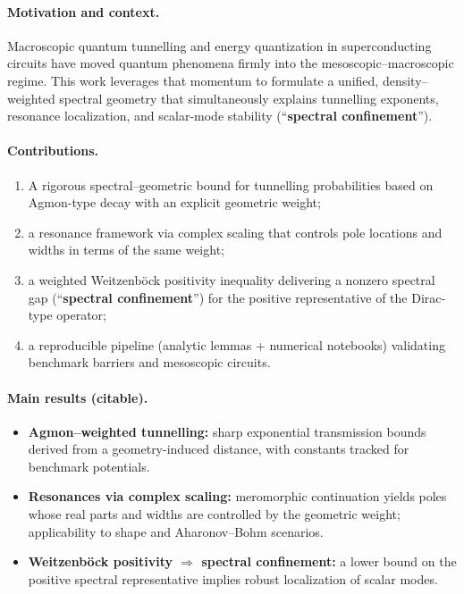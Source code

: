 \documentclass[11pt]{article}
\theoremstyle{definition}
\begin{document}
	\paragraph{Motivation and context.}
	Macroscopic quantum tunnelling and energy quantization in superconducting circuits have moved quantum phenomena firmly into the mesoscopic--macroscopic regime. This work leverages that momentum to formulate a unified, density–weighted spectral geometry that simultaneously explains tunnelling exponents, resonance localization, and scalar-mode stability (``\textbf{spectral confinement}'').
	
	\paragraph{Contributions.}
	\begin{enumerate}[label=(\roman*)]
	\item A rigorous spectral–geometric bound for tunnelling probabilities based on Agmon-type decay with an explicit geometric weight; 
	\item a resonance framework via complex scaling that controls pole locations and widths in terms of the same weight;
	\item a weighted Weitzenböck positivity inequality delivering a nonzero spectral gap (``\textbf{spectral confinement}'') for the positive representative of the Dirac-type operator; 
	\item a reproducible pipeline (analytic lemmas + numerical notebooks) validating benchmark barriers and mesoscopic circuits.
	\end{enumerate}
	\paragraph{Main results (citable).}
	\begin{itemize}
		\item \textbf{Agmon–weighted tunnelling:} sharp exponential transmission bounds derived from a geometry-induced distance, with constants tracked for benchmark potentials.
		\item \textbf{Resonances via complex scaling:} meromorphic continuation yields poles whose real parts and widths are controlled by the geometric weight; applicability to shape and Aharonov--Bohm scenarios.
		\item \textbf{Weitzenböck positivity \(\Rightarrow\) spectral confinement:} a lower bound on the positive spectral representative implies robust localization of scalar modes.
	\end{itemize}
	
\end{document}
